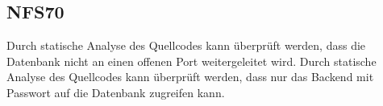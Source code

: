 \subsection*{NFS70}

Durch \gls{statische Analyse} des \Gls{Quellcode}s kann überprüft werden, dass die \Gls{Datenbank} nicht an einen offenen \Gls{Port} weitergeleitet wird.
Durch \gls{statische Analyse} des \Gls{Quellcode}s kann überprüft werden, dass nur das \Gls{Backend} mit Passwort auf die \Gls{Datenbank} zugreifen kann.
